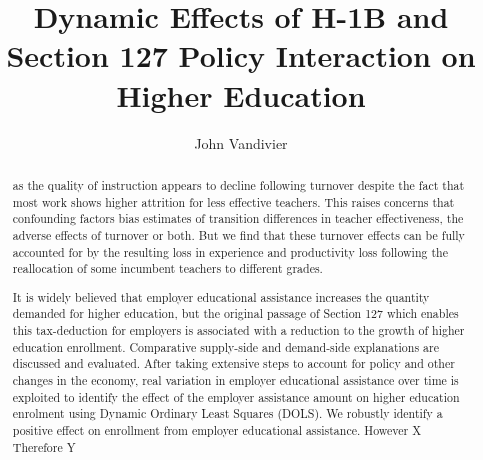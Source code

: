 \documentclass[review]{elsarticle}
\begin{document}
\begin{frontmatter}

\title{
    Dynamic Effects of H-1B and Section 127 Policy Interaction on Higher Education
}

\author[mymainaddress]{John Vandivier} %
\address[mymainaddress]{4400 University Dr, Fairfax, VA 22030}



\begin{abstract}
    as the quality of instruction appears to decline following turnover despite the fact that most work shows higher attrition for less effective teachers.
    This raises concerns that confounding factors bias estimates of transition differences in teacher effectiveness,
    the adverse effects of turnover or both.
    But we find that these turnover effects can be fully accounted for by the resulting loss in experience and productivity loss following the reallocation of some incumbent teachers to different grades.

    It is widely believed that employer educational assistance increases the quantity demanded for higher education,
    but the original passage of Section 127 which enables this tax-deduction for employers is associated with a reduction to the growth of higher education enrollment.
    Comparative supply-side and demand-side explanations are discussed and evaluated.
    After taking extensive steps to account for policy and other changes in the economy,
    real variation in employer educational assistance over time is exploited
    to identify the effect of the employer assistance amount on higher education enrolment using Dynamic Ordinary Least Squares (DOLS).
    We robustly identify a positive effect on enrollment from employer educational assistance.
    However X
    Therefore Y


\end{abstract}
\end{frontmatter}
\end{document}
